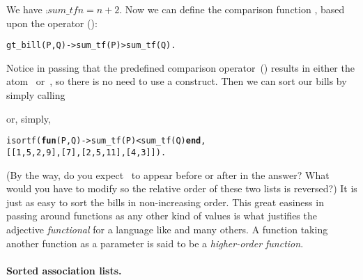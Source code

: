 We have \(\comp{sum\_tf}{n} = n + 2\). Now we can define the
comparison function , based upon the operator
(\erlcode{>}):
\begin{alltt}
gt_bill(P,Q) -> sum_tf(P) > sum_tf(Q).
\end{alltt}
Notice in passing that the predefined \Erlang comparison
operator~(\erlcode{>}) results in either the atom
~or~, so there is no need to use a
 construct. Then we can sort our bills by simply calling
\begin{center}
\end{center}
or, simply,
\begin{alltt}
      isortf(\textbf{fun}(P,Q) -> sum_tf(P) < sum_tf(Q) \textbf{end},
             [[1,5,2,9],[7],[2,5,11],[4,3]]).
\end{alltt}
(By the way, do you expect~\erlcode{[7]} to appear before or after
\erlcode{[4,3]} in the answer? What would you have to modify so the
relative order of these two lists is reversed?) It is just as easy to
sort the bills in non\hyp{}increasing order. This great easiness in
passing around functions as any other kind of values is what justifies
the adjective \emph{functional} for a language like \Erlang and many
others. A function taking another function as a parameter is said to
be a \emph{higher\hyp{}order function}.

\medskip

\paragraph{Sorted association lists.}
\label{sorted_association_lists}

